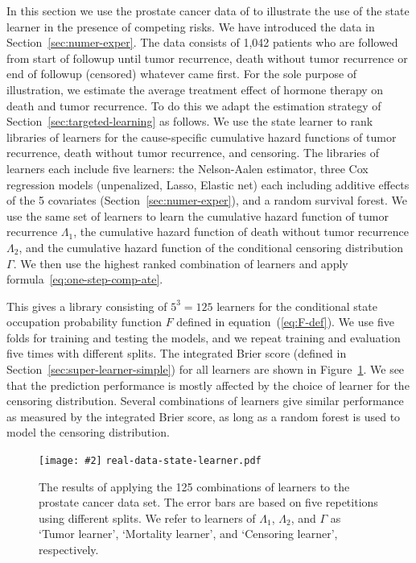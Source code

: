 \documentclass[11pt]{article}
\theoremstyle{thmstyleone}%
\theoremstyle{thmstyletwo}%
\theoremstyle{thmstylethree}%
\newcommand{\includeFigCond}[2][]{
  \ifx\nofig\undefined %
    \texttt{[image: \#2]} %
  \else %
    \texttt{#2} %
  \fi %
}
\newcommand{\1}{\mathds{1}}
\begin{document}
In this section we use the prostate cancer data of
\cite{kattan2000pretreatment} to illustrate the use of the state
learner in the presence of competing risks. We have introduced the
data in Section~\ref{sec:numer-exper}. The data consists of 1,042
patients who are followed from start of followup until tumor
recurrence, death without tumor recurrence or end of followup
(censored) whatever came first. For the sole purpose of illustration,
we estimate the average treatment effect of hormone therapy on death
and tumor recurrence. To do this we adapt the estimation strategy of
Section~\ref{sec:targeted-learning} as follows. We use the state
learner to rank libraries of learners for the cause-specific
cumulative hazard functions of tumor recurrence, death without tumor
recurrence, and censoring.  The libraries of learners each include
five learners: the Nelson-Aalen estimator, three Cox regression models
(unpenalized, Lasso, Elastic net) each including additive effects of
the 5 covariates (Section~\ref{sec:numer-exper}), and a random
survival forest. We use the same set of learners to learn the
cumulative hazard function of tumor recurrence \( \Lambda_1 \), the
cumulative hazard function of death without tumor recurrence
\( \Lambda_2 \), and the cumulative hazard function of the conditional
censoring distribution $\Gamma$.  We then use the highest ranked
combination of learners and apply
formula~\eqref{eq:one-step-comp-ate}.

This gives a library consisting of \( 5^3 = 125 \) learners for the
conditional state occupation probability function \( F \) defined in
equation~(\ref{eq:F-def}). We use five folds for training and testing
the models, and we repeat training and evaluation five times with
different splits.  The integrated Brier score (defined in
Section~\ref{sec:super-learner-simple}) for all learners are shown in
Figure~\ref{fig:zelefski-real}. We see that the prediction
performance is mostly affected by the choice of learner for the
censoring distribution. Several combinations of learners give similar
performance as measured by the integrated Brier score, as long as a
random forest is used to model the censoring distribution.

\begin{figure}
  \centering %
  \includeFigCond[width=1\linewidth]{real-data-state-learner.pdf}
  \caption[]{The results of applying the 125 combinations of learners to the
    prostate cancer data set. The error bars are based on five repetitions using
    different splits. We refer to learners of \( \Lambda_1 \), \( \Lambda_2 \),
    and $\Gamma$ as `Tumor learner', `Mortality learner', and `Censoring
    learner', respectively.}
  \label{fig:zelefski-real}
\end{figure}
\end{document}
